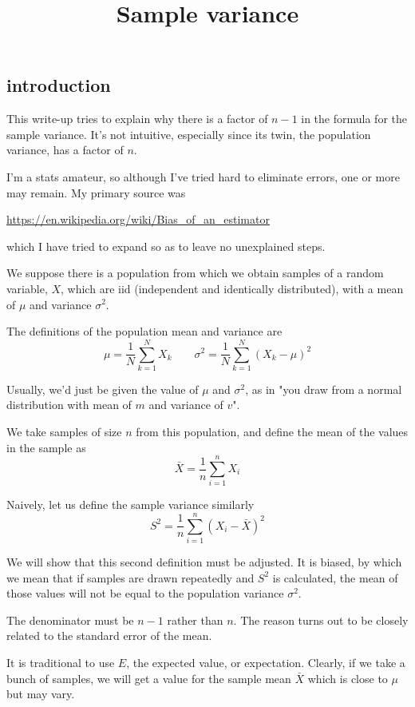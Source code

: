 \documentclass[11pt, oneside]{article}
\title{Sample variance}
\date{}
\begin{document}
\maketitle
\Large


\subsection*{introduction}

This write-up tries to explain why there is a factor of $n-1$ in the formula for the sample variance.  It's not intuitive, especially since its twin, the population variance, has a factor of $n$.

I'm a stats amateur, so although I've tried hard to eliminate errors, one or more may remain.  My primary source was

\url{https://en.wikipedia.org/wiki/Bias_of_an_estimator}

which I have tried to expand so as to leave no unexplained steps.

We suppose there is a population from which we obtain samples of a random variable, $X$, which are iid (independent and identically distributed), with a mean of $\mu$ and variance $\sigma^2$.

The definitions of the population mean and variance are
\[ \mu= \frac{1}{N} \sum_{k=1}^{N} X_k \ \ \ \ \ \ \ \ \ \sigma^2 = \frac{1}{N} \sum_{k=1}^{N} (X_k - \mu)^2 \]

Usually, we'd just be given the value of $\mu$ and $\sigma^2$, as in "you draw from a normal distribution with mean of $m$ and variance of $v$".  

We take samples of size $n$ from this population, and define  the mean of the values in the sample as
\[ \bar{X} = \frac{1}{n} \sum_{i=1}^{n} X_i \]

Naively, let us define the sample variance similarly
\[ S^2 = \frac{1}{n} \sum_{i=1}^{n} (X_i - \bar{X})^2 \]

We will show that this second definition must be adjusted.  It is biased, by which we mean that if samples are drawn repeatedly and $S^2$ is calculated, the mean of those values will not be equal to the population variance $\sigma^2$.

The denominator must be $n-1$ rather than $n$.  The reason turns out to be closely related to the standard error of the mean.

It is traditional to use $E$, the expected value, or expectation.  Clearly, if we take a bunch of samples, we will get a value for the sample mean $\bar{X}$ which is close to $\mu$ but may vary.
\end{document}

